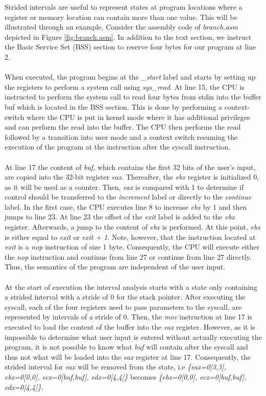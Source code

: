 \documentclass{kththesis}
\renewcommand{\it}[1]{\textit{#1}}
\begin{document}
\clearpage
\noindent
Strided intervals are useful to represent states at program locations where a register or memory location can contain more than one value. This will be illustrated through an example. Consider the assembly code of \it{branch.asm} depicted in Figure \ref{fig:branch.asm}. In addition to the text section, we instruct the Basic Service Set (BSS) section to reserve four bytes for our program at line 2. 
\\ \\
When executed, the program begins at the \it{\_start} label and starts by setting up the registers to perform a system call using \it{sys\_read}. At line 15, the CPU is instructed to perform the system call to read four bytes from stdin into the buffer buf which is located in the BSS section. This is done by performing a context-switch where the CPU is put in kernel mode where it has additional privileges and can perform the read into the buffer. The CPU then performs the read followed by a transition into user mode and a context switch resuming the execution of the program at the instruction after the syscall instruction.
\\ \\ 
At line 17 the content of \it{buf}, which contains the first 32 bits of the user's input, are copied into the 32-bit register \it{eax}. Thereafter, the \it{ebx} register is initialized 0, as it will be used as a counter. Then, \it{eax} is compared with 1 to determine if control should be transferred to the \it{increment} label or directly to the \it{continue} label. In the first case, the CPU executes line 8 to increase \it{ebx} by 1 and then jumps to line 23. At line 23 the offset of the \it{exit} label is added to the \it{ebx} register. Afterwards, a jump to the content of \it{ebx} is performed. At this point, \it{ebx} is either equal to \it{exit} or \it{exit + 1}. Note, however, that the instruction located at \it{exit} is a \it{nop} instruction of size 1 byte. Consequently, the CPU will execute either the \it{nop} instruction and continue from line 27 or continue from line 27 directly. Thus, the semantics of the program are independent of the user input. 
\\ \\
At the start of execution the interval analysis starts with a state only containing a strided interval with a stride of 0 for the stack pointer. After executing the syscall, each of the four registers used to pass parameters to the syscall, are represented by intervals of a stride of 0. Then, the \it{mov} instruction at line 17 is executed to load the content of the buffer into the \it{eax} register. However, as it is impossible to determine what user input is entered without actually executing the program, it is not possible to know what \it{buf} will contain after the syscall and thus not what will be loaded into the \it{eax} register at line 17. Consequently, the strided interval for \it{eax} will be removed from the state, i.e \it{\{eax=0[3,3], ebx=0[0,0], ecx=0[buf,buf], edx=0[4,4]\}} becomes \it{\{ebx=0[0,0], ecx=0[buf,buf], edx=0[4,4]\}}.
\end{document}

